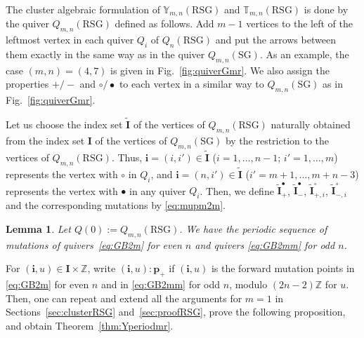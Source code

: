 \documentclass[pdftex]{sigma}
\numberwithin{equation}{section}
\newtheorem{Lemma}[Theorem]{Lemma}
\theoremstyle{definition}
\begin{document}
The cluster algebraic formulation
of $\mathbb{Y}_{m,n}(\mathrm{RSG})$
and $\mathbb{T}_{m,n}(\mathrm{RSG})$ is done
by the quiver
$Q_{m,n}(\mathrm{RSG})$ def\/ined as follows.
Add $m-1$ vertices to the left of the leftmost
vertex   in each quiver $Q_i$ of
$Q_{n}(\mathrm{RSG})$
and put the arrows between them  exactly in
the same way as in the quiver $Q_{m,n}(\mathrm{SG})$.
As an example, the case $(m,n)=(4,7)$
is given in
 Fig.~\ref{fig:quiverGmr}.
We also assign the properties $+/-$ and $\circ/\bullet$
to  each vertex
in a similar way to $Q_{m,n}(\mathrm{SG})$
 as in Fig.~\ref{fig:quiverGmr}.




Let us choose  the index set $\tilde{\mathbf{I}}$
of the vertices of $Q_{m,n}(\mathrm{RSG})$
naturally obtained from
the
index set $\mathbf{I}$
of the vertices of $Q_{m,n}(\mathrm{SG})$
by the restriction to the
vertices of $Q_{m,n}(\mathrm{RSG})$.
Thus, $\mathbf{i}=(i,i')\in \tilde{\mathbf{I}}$
($i=1,\dots,n-1$; $i'=1,\dots,m$) represents
the vertex  with $\circ$ in $Q_i$,
and $\mathbf{i}=(n,i')\in \tilde{\mathbf{I}}$
($i'=m+1,\dots,m+n-3$)
 represents
the vertex  with $\bullet$ in any quiver $Q_i$.
Then, we def\/ine
 $\tilde{\mathbf{I}}_+^{\bullet}$,
 $\tilde{\mathbf{I}}_-^{\bullet}$,
 $\tilde{\mathbf{I}}_{+,i}^{\circ}$,
 $\tilde{\mathbf{I}}_{-,i}^{\circ}$
and the corresponding mutations by \eqref{eq:mupm2m}.


\begin{Lemma}
\label{lem:GQmutmr}
Let $Q(0):=Q_{m,n}(\mathrm{RSG})$.
We have the periodic sequence of mutations of qui\-vers~\eqref{eq:GB2m} for even $n$ and
quivers \eqref{eq:GB2mm} for odd $n$.
\end{Lemma}

For $(\mathbf{i},u)\in \mathbf{I}\times \mathbb{Z}$,
write $(\mathbf{i},u):\mathbf{p}_+$
if $(\mathbf{i},u)$ is the forward mutation points
in \eqref{eq:GB2m} for even $n$ and  in \eqref{eq:GB2mm} for odd $n$,
modulo $(2n-2)\mathbb{Z}$ for $u$.
Then, one can repeat and extend all the arguments for $m=1$
in Sections~\ref{sec:clusterRSG} and~\ref{sec:proofRSG},
prove the following proposition, and obtain Theorem~\ref{thm:Yperiodmr}.
\end{document}
